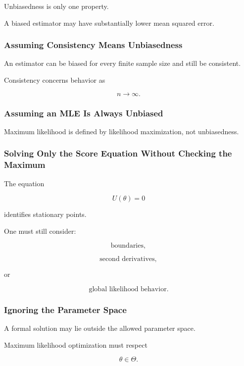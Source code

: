 Unbiasedness is only one property.

A biased estimator may have substantially lower mean squared error.

\subsubsection{Assuming Consistency Means Unbiasedness}

An estimator can be biased for every finite sample size and still be
consistent.

Consistency concerns behavior as

\[
n\to\infty.
\]

\subsubsection{Assuming an MLE Is Always Unbiased}

Maximum likelihood is defined by likelihood maximization, not
unbiasedness.

\subsubsection{Solving Only the Score Equation Without Checking the Maximum}

The equation

\[
U(\theta)=0
\]

identifies stationary points.

One must still consider:

\[
\boxed{
\text{boundaries},
}
\]

\[
\boxed{
\text{second derivatives},
}
\]

or

\[
\boxed{
\text{global likelihood behavior}.
}
\]

\subsubsection{Ignoring the Parameter Space}

A formal solution may lie outside the allowed parameter space.

Maximum likelihood optimization must respect

\[
\theta\in\Theta.
\]

